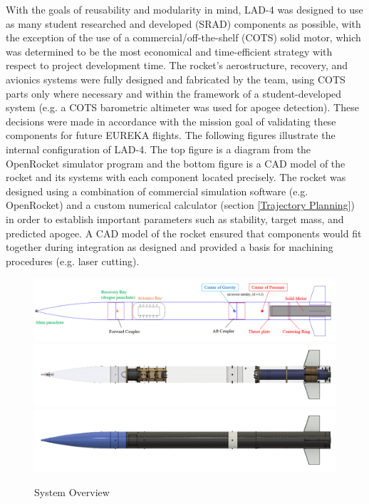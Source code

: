 With the goals of reusability and modularity in mind, LAD-4 was designed to use as many student researched and developed (SRAD) components as possible, with the exception of the use of a commercial/off-the-shelf (COTS) solid motor, which was determined to be the most economical and time-efficient strategy with respect to project development time. The rocket's aerostructure, recovery, and avionics systems were fully designed and fabricated by the team, using COTS parts only where necessary and within the framework of a student-developed system (e.g. a COTS barometric altimeter was used for apogee detection). These decisions were made in accordance with the mission goal of validating these components for future EUREKA flights. 
\newline\newline
The following figures illustrate the internal configuration of LAD-4. The top figure is a diagram from the OpenRocket simulator program and the bottom figure is a CAD model of the rocket and its systems with each component located precisely. The rocket was designed using a combination of commercial simulation software (e.g. OpenRocket) and a custom numerical calculator (section \ref{Trajectory Planning}) in order to establish important parameters such as stability, target mass, and predicted apogee. A CAD model of the rocket ensured that components would fit together during integration as designed and provided a basis for machining procedures (e.g. laser cutting).
\begin{figure}[H]
    \centering
    \includegraphics[width=\textwidth]{imgs/lad4skeletonfull.png}
    \includegraphics[width=\textwidth]{imgs/lad4internalfull.png}
    \includegraphics[width=\textwidth]{imgs/lad4airframefull.png}
    \caption{System Overview}
    \label{fig:systemoverview}
\end{figure}
